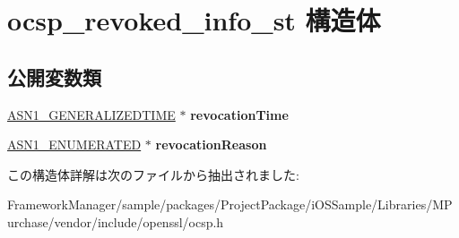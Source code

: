 \hypertarget{structocsp__revoked__info__st}{}\section{ocsp\+\_\+revoked\+\_\+info\+\_\+st 構造体}
\label{structocsp__revoked__info__st}
\subsection*{公開変数類}
\begin{DoxyCompactItemize}
\item 
\hypertarget{structocsp__revoked__info__st_af95cc4676f07ed0d45dfbe2c4b851902}{}\hyperlink{structasn1__string__st}{A\+S\+N1\+\_\+\+G\+E\+N\+E\+R\+A\+L\+I\+Z\+E\+D\+T\+I\+M\+E} $\ast$ {\bfseries revocation\+Time}\label{structocsp__revoked__info__st_af95cc4676f07ed0d45dfbe2c4b851902}

\item 
\hypertarget{structocsp__revoked__info__st_a07edd6ecff783b2ad3e0ecf143fdddc3}{}\hyperlink{structasn1__string__st}{A\+S\+N1\+\_\+\+E\+N\+U\+M\+E\+R\+A\+T\+E\+D} $\ast$ {\bfseries revocation\+Reason}\label{structocsp__revoked__info__st_a07edd6ecff783b2ad3e0ecf143fdddc3}

\end{DoxyCompactItemize}


この構造体詳解は次のファイルから抽出されました\+:\begin{DoxyCompactItemize}
\item 
Framework\+Manager/sample/packages/\+Project\+Package/i\+O\+S\+Sample/\+Libraries/\+M\+Purchase/vendor/include/openssl/ocsp.\+h\end{DoxyCompactItemize}
